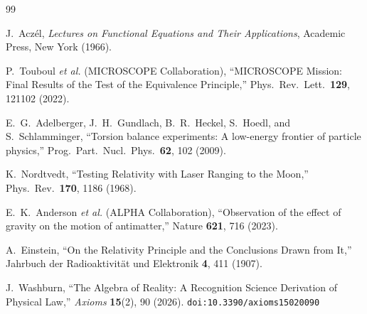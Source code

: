 \documentclass[12pt,a4paper]{article}
\theoremstyle{definition}
\theoremstyle{remark}
\begin{document}
\begin{thebibliography}{99}

J.~Acz\'el, \emph{Lectures on Functional Equations and Their Applications},
Academic Press, New York (1966).

P.~Touboul \textit{et al.} (MICROSCOPE Collaboration),
``MICROSCOPE Mission: Final Results of the Test of the
Equivalence Principle,'' Phys.\ Rev.\ Lett.\ \textbf{129},
121102 (2022).

E.~G.~Adelberger, J.~H.~Gundlach, B.~R.~Heckel,
S.~Hoedl, and S.~Schlamminger, ``Torsion balance experiments:
A low-energy frontier of particle physics,''
Prog.\ Part.\ Nucl.\ Phys.\ \textbf{62}, 102 (2009).

K.~Nordtvedt, ``Testing Relativity with Laser Ranging to
the Moon,'' Phys.\ Rev.\ \textbf{170}, 1186 (1968).

E.~K.~Anderson \textit{et al.} (ALPHA Collaboration),
``Observation of the effect of gravity on the motion of
antimatter,'' Nature \textbf{621}, 716 (2023).

A.~Einstein, ``On the Relativity Principle and the Conclusions
Drawn from It,'' Jahrbuch der Radioaktivit\"{a}t und Elektronik
\textbf{4}, 411 (1907).

J.~Washburn, ``The Algebra of Reality: A Recognition Science Derivation
of Physical Law,'' \emph{Axioms} \textbf{15}(2), 90 (2026).
\texttt{doi:10.3390/axioms15020090}

\end{thebibliography}
\end{document}
